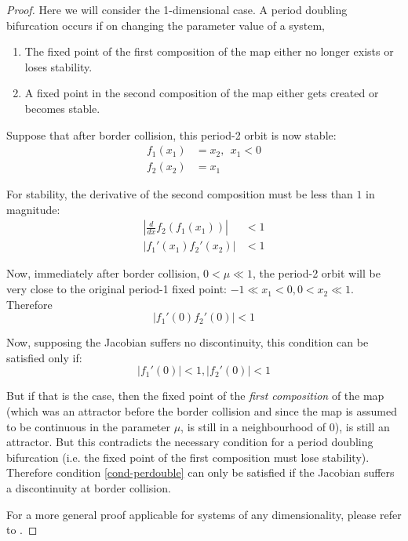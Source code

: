 \documentclass{book}
\renewcommand{\(}{\begin{columns}}
\renewcommand{\)}{\end{columns}}
\newcommand{\<}[1]{\begin{column}{#1}}
\renewcommand{\>}{\end{column}}
\begin{document}
\begin{proof}


Here we will consider the 1-dimensional case. A period doubling bifurcation occurs if on changing the parameter value of a system,
\begin{enumerate}
\item The fixed point of the first composition of the map either no longer 
exists or loses stability.  
\item A fixed point in the second composition of the map either gets created 
or becomes stable.  
\end{enumerate}

Suppose that after border collision, this period-2 orbit is now stable:
\begin{align*}
f_1(x_1)&=x_2,~~x_1<0\\
f_2(x_2)&=x_1
\end{align*}

For stability, the derivative of the second composition must be less than $1$ in magnitude:
\begin{align*}
\left|\frac{d}{dx}f_2(f_1(x_1))\right|&<1\\
\left|f_1'(x_1)f_2'(x_2)\right|&<1
\end{align*}

Now, immediately after border collision, $0<\mu\ll 1$, the period-2 orbit will be 
very close to the original period-1 fixed point: $-1\ll x_1<0, 0<x_2\ll 1$.  Therefore
\[
\left|f_1'(0)f_2'(0)\right|<1
\]

Now, supposing the Jacobian suffers no discontinuity, this condition can be 
satisfied only if:
\begin{equation}
\label{cond-perdouble}
\left|f_1'(0)\right|<1, \left|f_2'(0)\right|<1
\end{equation}


But if that is the case, then the fixed point of the \emph{first composition} 
of the map (which was an attractor before the border collision and since the 
map is assumed to be continuous in the parameter $\mu$, is still in a 
neighbourhood of $0$), is still an attractor.  But this contradicts the 
necessary condition for a period doubling bifurcation (i.e. the fixed point of 
the first composition must lose stability). Therefore condition 
\eqref{cond-perdouble} can only be satisfied if the Jacobian suffers a 
discontinuity at border collision.  


For a more general proof applicable for systems of any dimensionality, please 
refer to \cite{feigin-1999}.

\end{proof}
\end{document}
